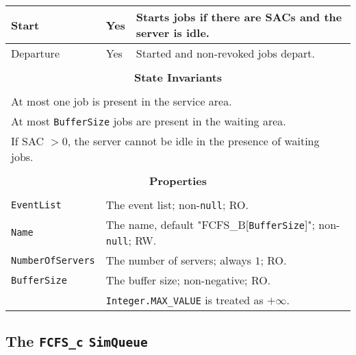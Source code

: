 \documentclass[12pt]{book}
\begin{document}
\begin{tabular}{|l|l|l|}
\hline
Start & Yes & Starts jobs if there are SACs and the server is idle. \\
\hline
Departure & Yes & Started and non-revoked jobs depart. \\
\hline
\multicolumn{3}{|c|}{} \\
\multicolumn{3}{|c|}{\bf State  Invariants} \\
\multicolumn{3}{|c|}{} \\
\hline
\multicolumn{3}{|l|}{At most one job is present in the service area.} \\
\multicolumn{3}{|l|}{At most \lstinline|BufferSize| jobs are present in the waiting area.} \\
\multicolumn{3}{|l|}{If SAC $> 0$, the server cannot be idle in the presence of waiting jobs.} \\
\hline
\multicolumn{3}{|c|}{} \\
\multicolumn{3}{|c|}{\bf Properties} \\
\multicolumn{3}{|c|}{} \\
\hline
\lstinline|EventList|       & \multicolumn{2}{|l|}{The event list; non-\lstinline|null|; RO.} \\
\hline
\lstinline|Name|            & \multicolumn{2}{|l|}{The name, default "FCFS\_B[\lstinline|BufferSize|]";
                                                   non-\lstinline|null|; RW.} \\
\hline
\lstinline|NumberOfServers| & \multicolumn{2}{|l|}{The number of servers; always $1$; RO.} \\
\hline
\lstinline|BufferSize|      & \multicolumn{2}{|l|}{The buffer size; non-negative; RO.} \\
                            & \multicolumn{2}{|l|}{\lstinline|Integer.MAX_VALUE| is treated as $+\infty$.} \\
\hline
\end{tabular}

\subsection{The \lstinline{FCFS_c} \lstinline{SimQueue}}
\end{document}

